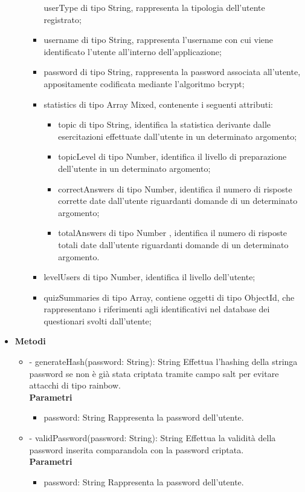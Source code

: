 \begin{itemize}
\begin{itemize}
\begin{itemize}
					userType di tipo String, rappresenta la tipologia dell'utente registrato;
				\item 
					username di tipo String, rappresenta l'username con cui viene identificato l'utente all'interno dell'applicazione;		
				\item
					password di tipo String, rappresenta la password associata all'utente,    appositamente codificata mediante l'algoritmo bcrypt;  		
				\item
					statistics di tipo Array Mixed, contenente i seguenti attributi:
				\begin{itemize}
					\item
						topic di tipo String, identifica la statistica derivante dalle esercitazioni effettuate dall'utente in un determinato argomento; 
					\item
						 topicLevel di tipo Number, identifica il livello di preparazione dell'utente in un determinato argomento;
					\item
						correctAnswers di tipo Number, identifica il numero di risposte corrette date dall'utente riguardanti domande di un determinato argomento; 
					\item						
						 totalAnswers di tipo Number	, identifica il numero di risposte totali date dall'utente riguardanti domande di un determinato argomento.		
				\end{itemize}		
				\item 
					levelUsers di tipo Number, identifica il livello dell'utente;				
				
				\item
					quizSummaries di tipo Array, contiene oggetti di tipo ObjectId, che rappresentano i riferimenti agli identificativi nel database dei questionari svolti dall'utente;		
			\end{itemize}	
		\end{itemize}	
	\item \textbf{Metodi} \\
		\begin{itemize}
		\item
		- generateHash(password: String): String
		Effettua l'hashing della stringa password se non è già stata criptata tramite campo salt per evitare attacchi di tipo rainbow. \\
		\textbf{Parametri} \\
			\begin{itemize}
			\item
				 password: String
				Rappresenta la password dell'utente.
			\end{itemize}
		\item
		- validPassword(password: String): String 
		Effettua la validità della password inserita comparandola con la password criptata.	\\
		\textbf{Parametri} \\
			\begin{itemize}
			\item
				 password: String
				Rappresenta la password dell'utente.
			\end{itemize}
		\end{itemize}	
\end{itemize}